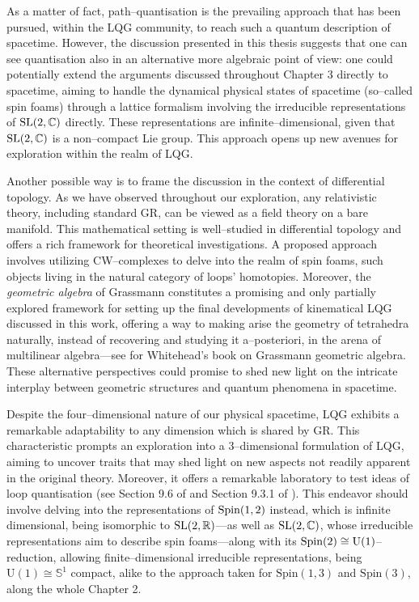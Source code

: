 As a matter of fact, path--quantisation is the prevailing approach that has been pursued, within the LQG community, to reach such a quantum description of spacetime. However, the discussion presented in this thesis suggests that one can see quantisation also in an alternative more algebraic point of view: one could potentially extend the arguments discussed throughout Chapter 3 directly to spacetime, aiming to handle the dynamical physical states of spacetime (so--called spin foams) through a lattice formalism involving the irreducible representations of $\text{\normalfont SL}(2,\mathbb{C})$ directly. These representations are infinite--dimensional, given that $\text{\normalfont SL}(2,\mathbb{C})$ is a non--compact Lie group. This approach opens up new avenues for exploration within the realm of LQG. %

Another possible way is to frame the discussion in the context of differential topology. As we have observed throughout our exploration, any relativistic theory, including standard GR, can be viewed as a field theory on a bare manifold. This mathematical setting is well--studied in differential topology and offers a rich framework for theoretical investigations. A proposed approach involves utilizing CW--complexes to delve into the realm of spin foams, such objects living in the natural category of loops' homotopies. Moreover, the \emph{geometric algebra} of Grassmann constitutes a promising and only partially explored framework for setting up the final developments of kinematical LQG discussed in this work, offering a way to making arise the geometry of tetrahedra naturally, instead of recovering and studying it a--posteriori, in the arena of multilinear algebra---see \cite{blake} for Whitehead's book on Grassmann geometric algebra. These alternative perspectives could promise to shed new light on the intricate interplay between geometric structures and quantum phenomena in spacetime.

Despite the four--dimensional nature of our physical spacetime, LQG exhibits a remarkable adaptability to any dimension which is shared by GR. This characteristic prompts an exploration into a $3$--dimensional formulation of LQG, aiming to uncover traits that may shed light on new aspects not readily apparent in the original theory. Moreover, it offers a remarkable laboratory to test ideas of loop quantisation (see Section 9.6 of \cite{pullin2} and Section 9.3.1 of \cite{rov1}). This endeavor should involve delving into the representations of $\text{\normalfont Spin}(1,2)$ instead, which is infinite dimensional, being isomorphic to $\text{\normalfont SL}(2,\mathbb{R})$---as well as $\text{\normalfont SL}(2,\mathbb{C})$, whose irreducible representations aim to describe spin foams---along with its $\text{\normalfont Spin}(2)\cong\mathrm{U}(1)$--reduction, allowing finite--dimensional irreducible representations, being $\mathrm{U}(1)\cong\mathbb{S}^1$ compact, alike to the approach taken for $\mathrm{Spin}(1,3)$ and $\mathrm{Spin}(3)$, along the whole Chapter 2.\\

